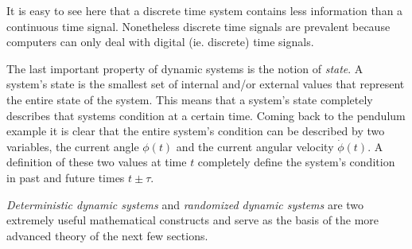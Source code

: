 It is easy to see here that a discrete time system contains less information than a continuous time signal. Nonetheless discrete time signals are prevalent because computers can only deal with digital (ie. discrete) time signals.

The last important property of dynamic systems is the notion of \textit{state}. A system's state is the smallest set of internal and/or external values that represent the entire state of the system. This means that a system's state completely describes that systems condition at a certain time. Coming back to the pendulum example it is clear that the entire system's condition can be described by two variables, the current angle $\phi(t)$ and the current angular velocity $\dot{\phi}(t)$. A definition of these two values at time $t$ completely define the system's condition in past and future times $t\pm\tau$.

\textit{Deterministic dynamic systems} and \textit{randomized dynamic systems} are two extremely useful mathematical constructs and serve as the basis of the more advanced theory of the next few sections.




